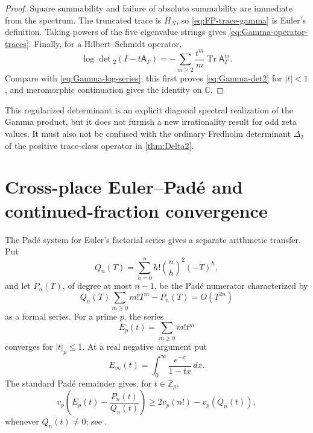 \documentclass[11pt]{article}
\theoremstyle{keio}
\theoremstyle{definition}
\theoremstyle{remark}
\newcommand{\C}{\mathbb C}
\newcommand{\Z}{\mathbb Z}
\newcommand{\Tr}{\operatorname{Tr}}
\begin{document}
\begin{proof}
Square summability and failure of absolute summability are immediate from
the spectrum.  The truncated trace is \(H_N\), so
\eqref{eq:FP-trace-gamma} is Euler's definition.  Taking powers of the five
eigenvalue strings gives \eqref{eq:Gamma-operator-traces}.  Finally, for a
Hilbert--Schmidt operator,
\[
 \log\det{}_2(I-t\mathsf A_\Gamma)
 =-\sum_{m\ge2}\frac{t^m}{m}\Tr\mathsf A_\Gamma^m.
\]
Compare with \eqref{eq:Gamma-log-series}; this first proves
\eqref{eq:Gamma-det2} for \(|t|<1\), and meromorphic continuation gives the
identity on \(\C\).
\end{proof}

This regularized determinant is an explicit diagonal spectral realization of the
Gamma product, but it does not furnish a new irrationality result for odd
zeta values.  It must also not be confused with the ordinary Fredholm
determinant \(\Delta_2\) of the positive trace-class operator in
\cref{thm:Delta2}.

\section{Cross-place Euler--Pad\'e and continued-fraction convergence}
\label{sec:cross-place-pade}

The Pad\'e system for Euler's factorial series gives a separate arithmetic
transfer.  Put
\begin{equation}\label{eq:Euler-Pade-Q}
 Q_n(T)=\sum_{h=0}^nh!\binom nh^2(-T)^h,
\end{equation}
and let \(P_n(T)\), of degree at most \(n-1\), be the Pad\'e numerator
characterized by
\begin{equation}\label{eq:Euler-Pade-condition}
 Q_n(T)\sum_{m\ge0}m!T^m-P_n(T)=O(T^{2n})
\end{equation}
as a formal series.  For a prime \(p\), the series
\begin{equation}\label{eq:p-adic-Euler-series}
 E_p(t)=\sum_{m\ge0}m!t^m
\end{equation}
converges for \(|t|_p\le1\).  At a real negative argument put
\begin{equation}\label{eq:real-Euler-function}
 E_\infty(t)=\int_0^\infty\frac{e^{-x}}{1-tx}\,dx.
\end{equation}
The standard Pad\'e remainder gives, for \(t\in\Z_p\),
\begin{equation}\label{eq:p-adic-remainder-bound}
 v_p\!\left(E_p(t)-\frac{P_n(t)}{Q_n(t)}\right)
 \ge2v_p(n!)-v_p(Q_n(t)),
\end{equation}
whenever \(Q_n(t)\ne0\); see
\cite{ErnvallMatalaSeppala2022}.
\end{document}
